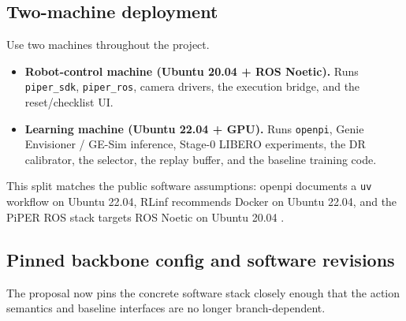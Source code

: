 \documentclass[10pt]{article}
\theoremstyle{plain}
\theoremstyle{definition}
\theoremstyle{remark}
\begin{document}
\subsection{Two-machine deployment}
Use two machines throughout the project.
\begin{itemize}
    \item \textbf{Robot-control machine (Ubuntu 20.04 + ROS Noetic).} Runs \texttt{piper\_sdk}, \texttt{piper\_ros}, camera drivers, the execution bridge, and the reset/checklist UI.
    \item \textbf{Learning machine (Ubuntu 22.04 + GPU).} Runs \texttt{openpi}, Genie Envisioner / GE-Sim inference, Stage-0 LIBERO experiments, the DR calibrator, the selector, the replay buffer, and the baseline training code.
\end{itemize}
This split matches the public software assumptions: openpi documents a \texttt{uv} workflow on Ubuntu 22.04, RLinf recommends Docker on Ubuntu 22.04, and the PiPER ROS stack targets ROS Noetic on Ubuntu 20.04 \citep{openpi2026repo,rlinfrepo2026,agilex2026piperros}.

\subsection{Pinned backbone config and software revisions}

The proposal now pins the concrete software stack closely enough that the action semantics and baseline interfaces are no longer branch-dependent.
\end{document}
